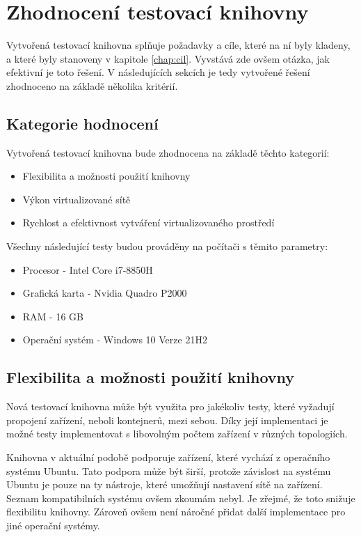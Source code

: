 \chapter{Zhodnocení testovací knihovny}\label{chap:review}

Vytvořená testovací knihovna splňuje požadavky a cíle, které na ní byly kladeny, a které byly stanoveny v kapitole \ref{chap:cil}. Vyvstává zde ovšem otázka, jak efektivní je toto řešení. V následujících sekcích je tedy vytvořené řešení zhodnoceno na základě několika kritérií.

\section{Kategorie hodnocení}

Vytvořená testovací knihovna bude zhodnocena na základě těchto kategorií:

\begin{itemize}
    \item Flexibilita a možnosti použití knihovny
    \item Výkon virtualizované sítě
    \item Rychlost a efektivnost vytváření virtualizovaného prostředí
\end{itemize}

\noindent Všechny následující testy budou prováděny na počítači s těmito parametry:

\begin{itemize}
    \item Procesor - Intel Core i7-8850H
    \item Grafická karta - Nvidia Quadro P2000
    \item RAM - 16 GB
    \item Operační systém - Windows 10 Verze 21H2
\end{itemize}


\section{Flexibilita a možnosti použití knihovny}
Nová testovací knihovna může být využita pro jakékoliv testy, které vyžadují propojení zařízení, neboli kontejnerů, mezi sebou. Díky její implementaci je možné testy implementovat s libovolným počtem zařízení v různých topologiích.

Knihovna v aktuální podobě podporuje zařízení, které vychází z operačního systému Ubuntu. Tato podpora může být širší, protože závislost na systému Ubuntu je pouze na ty nástroje, které umožňují nastavení sítě na zařízení. Seznam kompatibilních systému ovšem zkoumám nebyl. Je zřejmé, že toto snižuje flexibilitu knihovny. Zároveň ovšem není náročné přidat další implementace pro jiné operační systémy. 

